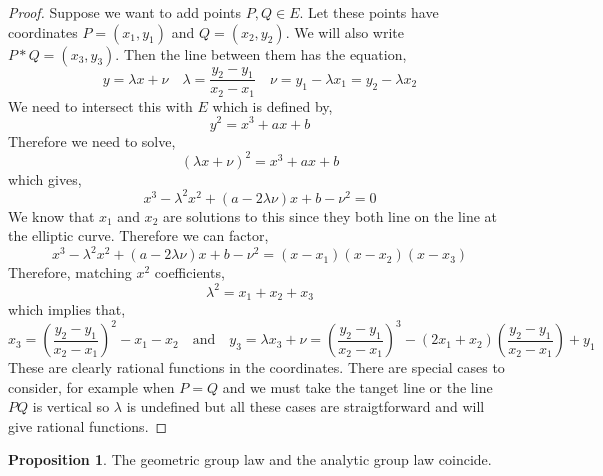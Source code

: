 \documentclass{article}
\theoremstyle{definition}
\newtheorem{proposition}[theorem]{Proposition}
\begin{document}
\begin{proof}
Suppose we want to add points $P, Q \in E$. Let these points have coordinates $P = (x_1, y_1)$ and $Q = (x_2, y_2)$. We will also write $P * Q = (x_3, y_3)$. Then the line between them has the equation,
\[ y = \lambda x + \nu \quad  \lambda = \frac{y_2 - y_1}{x_2 - x_1} \quad \nu = y_1 - \lambda x_1 = y_2 - \lambda x_2 \]
We need to intersect this with $E$ which is defined by,
\[ y^2 = x^3 + a x + b \]
Therefore we need to solve,
\[ (\lambda x + \nu)^2 = x^3 + a x + b \]
which gives,
\[ x^3 - \lambda^2 x^2 + (a - 2 \lambda \nu) x + b - \nu^2 = 0 \]
We know that $x_1$ and $x_2$ are solutions to this since they both line on the line at the elliptic curve. Therefore we can factor,
\[  x^3 - \lambda^2 x^2 + (a - 2 \lambda \nu) x + b - \nu^2 = (x - x_1)(x - x_2)(x - x_3) \]
Therefore, matching $x^2$ coefficients,
\[ \lambda^2 = x_1 + x_2 + x_3 \]
which implies that,
\[ x_3 = \left( \frac{y_2 - y_1}{x_2 - x_1} \right)^2 - x_1 - x_2 \quad \text{and} \quad y_3 = \lambda x_3 + \nu = \left( \frac{y_2 - y_1}{x_2 - x_1} \right)^3 - (2x_1 + x_2) \left( \frac{y_2 - y_1}{x_2 - x_1} \right) + y_1  \]
These are clearly rational functions in the coordinates. There are special cases to consider, for example when $P = Q$ and we must take the tanget line or the line $PQ$ is vertical so $\lambda$ is undefined but all these cases are straigtforward and will give rational functions. 
\end{proof}

\begin{proposition}
The geometric group law and the analytic group law coincide.
\end{proposition}
\end{document}
